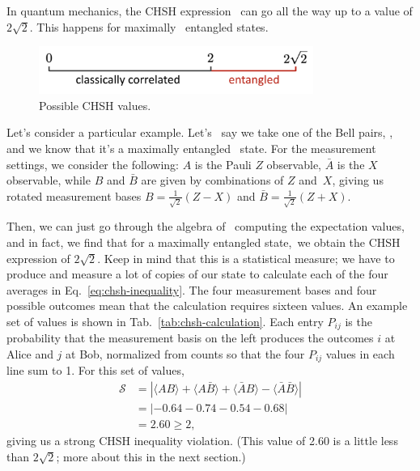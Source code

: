 In quantum mechanics, the CHSH expression 
can go all the way up to a value of $2\sqrt{2}$. This happens for maximally 
entangled states.

\begin{figure}[H]
    \centering
    \includegraphics[width=0.8\textwidth]{lesson10/chsh-values.png}
        \caption{Possible CHSH values.}
    \label{fig:chsh-values}
\end{figure}

Let's consider a particular example. Let's 
say we take one of the Bell pairs, \ket{\Psi^+},
and we know that it's a maximally entangled 
state. For the measurement settings,
we consider the following: $A$ is the Pauli $Z$ 
observable, $\bar{A}$ is the $X$ observable, while $B$ and $\bar{B}$ are given by combinations of $Z$ and $X$, giving us rotated measurement bases $B=\frac{1}{\sqrt{2}}(Z-X)$ and $\bar{B}=\frac{1}{\sqrt{2}}(Z+X)$.

Then, we can just go through the algebra of 
computing the expectation values, and in fact, we find that for a maximally entangled state, we obtain the CHSH expression of $2\sqrt{2}$. Keep in mind that this is a statistical measure; we have to produce and measure a lot of copies of our state to calculate each of the four averages in Eq.~\ref{eq:chsh-inequality}. The four measurement bases and four possible outcomes mean that the calculation requires sixteen values. An example set of values is shown in Tab.~\ref{tab:chsh-calculation}.  Each entry $P_{ij}$ is the probability that the measurement basis on the left produces the outcomes $i$ at Alice and $j$ at Bob, normalized from counts so that the four $P_{ij}$ values in each line sum to 1.  For this set of values,
\begin{equation}
\begin{aligned}
\mathcal{S} &= |\langle A B\rangle+\langle A \bar{B}\rangle+\langle\bar{A} B\rangle-\langle\bar{A} \bar{B}\rangle| \\
&= | -0.64 -0.74 - 0.54 - 0.68 | \\
&= 2.60 \geq 2,
\end{aligned}
\label{eq:chsh-example}
\end{equation}
giving us a strong CHSH inequality violation.  (This value of 2.60 is a little less than $2\sqrt{2}$; more about this in the next section.)

